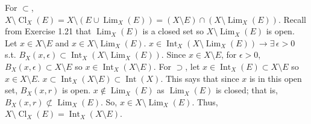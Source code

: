 \documentclass[12pt,letterpaper,boxed]{hmcpset}
\DeclareMathOperator{\Lim}{Lim}
\DeclareMathOperator{\Int}{Int}
\DeclareMathOperator{\Cl}{Cl}
\begin{document}
\begin{solution}
For $\subset$, $X\setminus\Cl_X(E)=X\setminus(E \cup \Lim_X(E)) = (X \setminus E) \cap (X\setminus \Lim_X(E))$. Recall from Exercise 1.21 that $\Lim_X (E)$ is a closed set so $X\setminus\Lim_X(E)$ is open. Let $x \in X\setminus E$ and $x \in X\setminus\Lim_X(E)$. $x \in \Int_X(X\setminus\Lim_X(E)) \rightarrow \exists\, \epsilon > 0$ s.t. $B_X(x, \epsilon) \subset \Int_X(X\setminus\Lim_X(E)).$ Since $x \in X\setminus E$, for $\epsilon > 0$, $B_X(x, \epsilon) \subset X\setminus E$ so $x \in \Int_X(X\setminus E).$ For $\supset$, let $x \in \Int_X(E) \subset X\setminus E$ so $x \in X \setminus E$. $x \subset \Int_X(X\setminus E) \subset \Int(X).$ This says that since $x$ is in this open set, $B_X(x,r)$ is open. $x \notin \Lim_X(E)$ as $\Lim_X(E)$ is closed; that is, $B_X(x, r) \not\subset \Lim_X(E)$. So, $x \in X\setminus\Lim_X(E)$. Thus, $X\setminus\Cl_X(E)=\Int_X(X\setminus E)$. 
\end{solution} 
\end{document}
